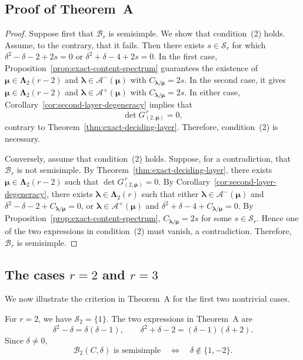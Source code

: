 \documentclass[10pt,a4paper]{amsart}
\newcommand{\1}{\mathfrak{1}}
\newcommand{\B}{\mathcal{B}}
\begin{document}
\subsection{Proof of Theorem~A}

\begin{proof}
Suppose first that $\B_r$ is semisimple.
We show that condition~{\rm(2)} holds.
Assume, to the contrary, that it fails.
Then there exists $s\in\mathscr S_r$ for which
$\delta^2-\delta-2+2s=0$ or
$\delta^2+\delta-4+2s=0$.
In the first case,
Proposition~\ref{prop:exact-content-spectrum}
guarantees the existence of
$\bm\mu\in\bm\Lambda_2(r-2)$ and
$\bm\lambda\in\mathcal A^-(\bm\mu)$ with
$C_{\bm\lambda/\bm\mu}=2s$.
In the second case, it gives
$\bm\mu\in\bm\Lambda_2(r-2)$ and
$\bm\lambda\in\mathcal A^+(\bm\mu)$ with
$C_{\bm\lambda/\bm\mu}=2s$.
In either case, Corollary~\ref{cor:second-layer-degeneracy}
implies that
$$
\det G_{(2,\bm\mu)}^{\,r}=0,
$$
contrary to Theorem~\ref{thm:exact-deciding-layer}.
Therefore, condition~{\rm(2)} is necessary.

Conversely, assume that condition~{\rm(2)} holds.
Suppose, for a contradiction, that $\B_r$ is not
semisimple.
By Theorem~\ref{thm:exact-deciding-layer}, there exists
$\bm\mu\in\bm\Lambda_2(r-2)$ such that
$\det G_{(2,\bm\mu)}^{\,r}=0$.
By Corollary~\ref{cor:second-layer-degeneracy},
there exists $\bm\lambda\in\bm\Lambda_2(r)$ such that
either $\bm\lambda\in\mathcal A^-(\bm\mu)$ and
$\delta^2-\delta-2+C_{\bm\lambda/\bm\mu}=0$,
or $\bm\lambda\in\mathcal A^+(\bm\mu)$ and
$\delta^2+\delta-4+C_{\bm\lambda/\bm\mu}=0$.
By Proposition~\ref{prop:exact-content-spectrum},
$C_{\bm\lambda/\bm\mu}=2s$ for some
$s\in\mathscr S_r$.
Hence one of the two expressions in
condition~{\rm(2)} must vanish, a contradiction.
Therefore, $\B_r$ is semisimple.
\end{proof}

\subsection{The cases $r=2$ and $r=3$}

We now illustrate the criterion in
Theorem~A for the first two
nontrivial cases.

For $r=2$, we have $\mathscr S_2=\{1\}$.
The two expressions in Theorem~A are
$$
\delta^2-\delta=\delta(\delta-1),
\qquad
\delta^2+\delta-2=(\delta-1)(\delta+2).
$$
Since $\delta\neq0$,
$$
\B_2(C,\delta)\text{ is semisimple}
\quad\Longleftrightarrow\quad
\delta\notin\{1,-2\}.
$$
\end{document}
